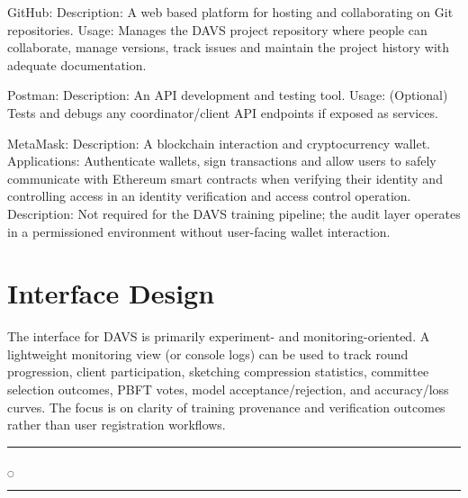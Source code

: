 GitHub:
Description: A web based platform for hosting and collaborating on Git repositories.
Usage: Manages the DAVS project repository where people can collaborate, manage versions, track issues and maintain the project history with adequate documentation.

Postman:
Description: An API development and testing tool.
Usage: (Optional) Tests and debugs any coordinator/client API endpoints if exposed as services.

MetaMask:
Description: A blockchain interaction and cryptocurrency wallet. Applications: Authenticate wallets, sign transactions and allow users to safely communicate with Ethereum smart contracts when verifying their identity and controlling access in an identity verification and access control operation.
Description: Not required for the DAVS training pipeline; the audit layer operates in a permissioned environment without user-facing wallet interaction.


\section{Interface Design}
The interface for DAVS is primarily experiment- and monitoring-oriented. A lightweight monitoring view (or console logs) can be used to track round progression, client participation, sketching compression statistics, committee selection outcomes, PBFT votes, model acceptance/rejection, and accuracy/loss curves. The focus is on clarity of training provenance and verification outcomes rather than user registration workflows.


\rule{0.49\textwidth}{0.75pt} $_{\bigcirc}$ \rule{0.49\textwidth}{0.75pt}\\
